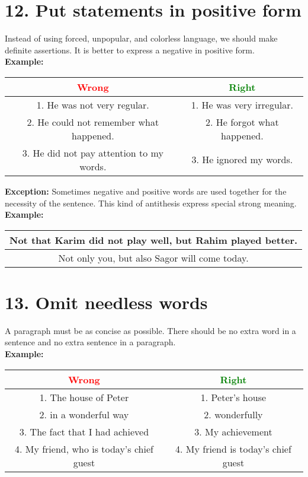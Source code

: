 \documentclass{report}
\newcommand{\DoubleRowSingleCol}[2]{
    \begin{center}
    \begin{tabular}{|c|}
     \hline
     #1\\\hline
     #2\\\hline
    \end{tabular}
    \end{center}
}
\begin{document}
\endgraf\bigskip

\section*{12. Put statements in positive form}

Instead of using forced, unpopular, and colorless language, we should make definite assertions. It is better to express a negative in positive form.\\ 

\textbf{Example:}

\begin{center}
\begin{tabular}{|c|c|}
 \hline
 \textcolor{red}{Wrong} & \textcolor{green}{Right}\\\hline
 1. He was not very regular.
 & 1. He was very irregular.\\\hline
 2. He could not remember what happened.
 & 2. He forgot what happened.\\\hline 
 3. He did not pay attention to my words.
 & 3. He ignored my words.\\\hline 
\end{tabular}
\end{center}

\textbf{\Large{Exception:}}
Sometimes negative and positive words are used together for the necessity of the sentence. This kind of antithesis express special strong meaning.\\

\textbf{Example:}

\DoubleRowSingleCol
{Not that Karim did not play well, but Rahim played better.}
{Not only you, but also Sagor will come today.}

\newpage

\section*{13. Omit needless words}

A paragraph must be as concise as possible. There should be no extra word in a sentence and no extra sentence in a paragraph.\\

\textbf{Example:}
\begin{center}
\begin{tabular}{|c|c|}
 \hline
 \textcolor{red}{Wrong} & \textcolor{green}{Right}\\\hline
 1. The house of Peter
 & 1. Peter's house\\\hline
 2. in a wonderful way
 & 2. wonderfully\\\hline
 3. The fact that I had achieved
 & 3. My achievement\\\hline
 4. My friend, who is today's chief guest
 & 4. My friend is today's chief guest \\\hline
\end{tabular}
\end{center}
\end{document}
